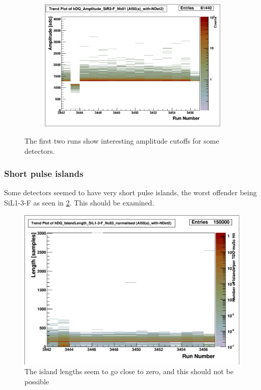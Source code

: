 \documentclass[a4paper]{article}
\begin{document}
\begin{figure}
\begin{subfigure}{0.5\textwidth}
  \end{subfigure}%
  \begin{subfigure}{0.5\textwidth}
    \includegraphics[width=0.9\linewidth]{figs/al50andet2/sir2f_amp}
  \end{subfigure}
  \caption{The first two runs show interesting amplitude cutoffs for some detectors.}
  \label{fig:al50andet2_amps}
\end{figure}


\subsubsection{Short pulse islands}
\label{sec:al50andet2_length}

Some detectors seemed to have very short pulse islands, the worst offender being SiL1-3-F as seen in \ref{fig:al50andet2_length}.
This should be examined.

\begin{figure}
  \centering
  \includegraphics[width=0.9\linewidth]{figs/al50andet2/sil13f_length}
  \caption{The island lengths seem to go close to zero, and this should not be possible}
  \label{fig:al50andet2_length}
\end{figure}
\end{document}

